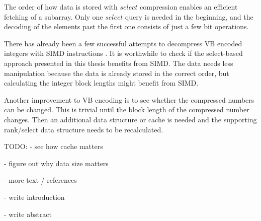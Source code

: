 The order of how data is stored with $select$ compression enables an efficient fetching of a subarray. Only one $select$ query is needed in the beginning, and the decoding of the elements past the first one 
consists of just a few bit operations. 


There has already been a few successful attempts to decompress VB encoded integers with SIMD instructions \citep{Lem18,Pla15}. It is worthwhile to check if the select-based approach presented 
in this thesis benefits from SIMD. The data needs less manipulation because the data is already stored in the correct order, but calculating the integer block lengths might benefit from SIMD.

Another improvement to VB encoding is to see whether the compressed numbers can be changed. This is trivial until the block length of the compressed number changes. Then an additional data structure or 
cache is needed and the supporting rank/select data structure needs to be recalculated.

TODO:
 - see how cache matters

 - figure out why data size matters

 - more text / references

 - write introduction

 - write abstract



